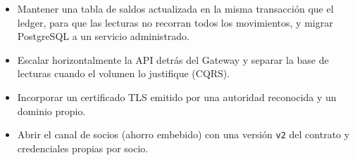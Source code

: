 \begin{itemize}
  \item Mantener una tabla de saldos actualizada en la misma transacción que el ledger, para que las lecturas no recorran todos los movimientos, y migrar PostgreSQL a un servicio administrado.
  \item Escalar horizontalmente la API detrás del Gateway y separar la base de lecturas cuando el volumen lo justifique (CQRS).
  \item Incorporar un certificado TLS emitido por una autoridad reconocida y un dominio propio.
  \item Abrir el canal de socios (ahorro embebido) con una versión \texttt{v2} del contrato y credenciales propias por socio.
\end{itemize}
